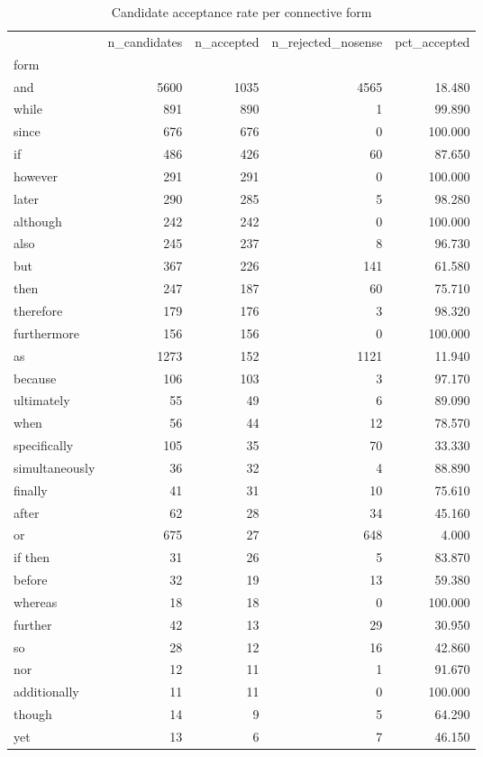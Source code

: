 \begin{table}
\caption{Candidate acceptance rate per connective form}
\begin{tabular}{lrrrr}
\toprule
 & n\_candidates & n\_accepted & n\_rejected\_nosense & pct\_accepted \\
form &  &  &  &  \\
\midrule
and & 5600 & 1035 & 4565 & 18.480 \\
while & 891 & 890 & 1 & 99.890 \\
since & 676 & 676 & 0 & 100.000 \\
if & 486 & 426 & 60 & 87.650 \\
however & 291 & 291 & 0 & 100.000 \\
later & 290 & 285 & 5 & 98.280 \\
although & 242 & 242 & 0 & 100.000 \\
also & 245 & 237 & 8 & 96.730 \\
but & 367 & 226 & 141 & 61.580 \\
then & 247 & 187 & 60 & 75.710 \\
therefore & 179 & 176 & 3 & 98.320 \\
furthermore & 156 & 156 & 0 & 100.000 \\
as & 1273 & 152 & 1121 & 11.940 \\
because & 106 & 103 & 3 & 97.170 \\
ultimately & 55 & 49 & 6 & 89.090 \\
when & 56 & 44 & 12 & 78.570 \\
specifically & 105 & 35 & 70 & 33.330 \\
simultaneously & 36 & 32 & 4 & 88.890 \\
finally & 41 & 31 & 10 & 75.610 \\
after & 62 & 28 & 34 & 45.160 \\
or & 675 & 27 & 648 & 4.000 \\
if then & 31 & 26 & 5 & 83.870 \\
before & 32 & 19 & 13 & 59.380 \\
whereas & 18 & 18 & 0 & 100.000 \\
further & 42 & 13 & 29 & 30.950 \\
so & 28 & 12 & 16 & 42.860 \\
nor & 12 & 11 & 1 & 91.670 \\
additionally & 11 & 11 & 0 & 100.000 \\
though & 14 & 9 & 5 & 64.290 \\
yet & 13 & 6 & 7 & 46.150 \\

\end{tabular}
\end{table}
